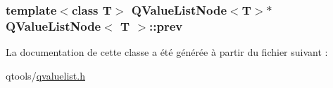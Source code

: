\subsubsection[{prev}]{\setlength{\rightskip}{0pt plus 5cm}template$<$class T$>$ {\bf Q\+Value\+List\+Node}$<$T$>$$\ast$ {\bf Q\+Value\+List\+Node}$<$ T $>$\+::prev}\label{class_q_value_list_node_a2c968e12a5de6c529ea91cd10116c70c}


La documentation de cette classe a été générée à partir du fichier suivant \+:\begin{DoxyCompactItemize}
\item 
qtools/\hyperlink{qvaluelist_8h}{qvaluelist.\+h}\end{DoxyCompactItemize}
